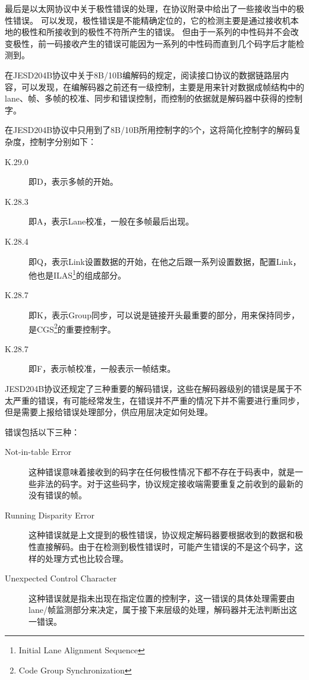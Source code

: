 \documentclass[UTF8]{ctexart}
\begin{document}
最后是以太网协议中关于极性错误的处理，在协议附录中给出了一些接收当中的极性错误。
可以发现，极性错误是不能精确定位的，它的检测主要是通过接收机本地的极性和所接收到的极性不符所产生的错误。
但由于一系列的中性码并不会改变极性，前一码接收产生的错误可能因为一系列的中性码而直到几个码字后才能检测到。

在JESD204B协议中关于8B/10B编解码的规定，阅读接口协议的数据链路层内容，可以发现，在编解码器之前还有一级控制，主要是用来针对数据成帧结构中的lane、帧、多帧的校准、同步和错误控制，而控制的依据就是解码器中获得的控制字。

在JESD204B协议中只用到了8B/10B所用控制字的5个，这将简化控制字的解码复杂度，控制字分别如下：

\begin{description}
  \item[K.29.0] 即D，表示多帧的开始。
  \item[K.28.3] 即A，表示Lane校准，一般在多帧最后出现。
  \item[K.28.4] 即Q，表示Link设置数据的开始，在他之后跟一系列设置数据，配置Link，他也是ILAS\footnote{Initial Lane Alignment Sequence}的组成部分。
  \item[K.28.7] 即K，表示Group同步，可以说是链接开头最重要的部分，用来保持同步，是CGS\footnote{Code Group Synchronization}的重要控制字。
  \item[K.28.7] 即F，表示帧校准，一般表示一帧结束。
\end{description}

JESD204B协议还规定了三种重要的解码错误，这些在解码器级别的错误是属于不太严重的错误，有可能经常发生，在错误并不严重的情况下并不需要进行重同步，但是需要上报给错误处理部分，供应用层决定如何处理。

错误包括以下三种：

\begin{description}
  \item[Not-in-table Error] 这种错误意味着接收到的码字在任何极性情况下都不存在于码表中，就是一些非法的码字。对于这些码字，协议规定接收端需要重复之前收到的最新的没有错误的帧。
  \item[Running Disparity Error] 这种错误就是上文提到的极性错误，协议规定解码器要根据收到的数据和极性直接解码。由于在检测到极性错误时，可能产生错误的不是这个码字，这样的处理方式也比较合理。
  \item[Unexpected Control Character] 这种错误就是指未出现在指定位置的控制字，这一错误的具体处理需要由lane/帧监测部分来决定，属于接下来层级的处理，解码器并无法判断出这一错误。
\end{description}
\end{document}
